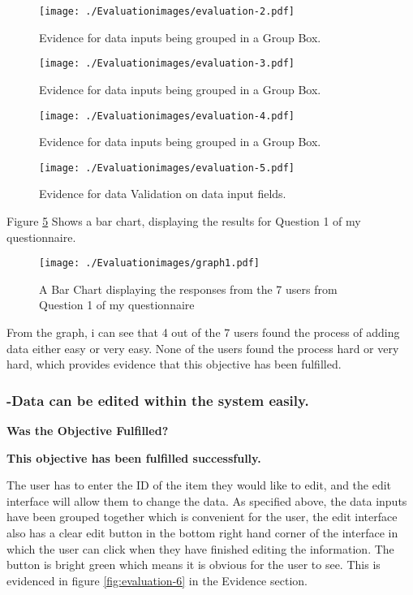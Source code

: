 \begin{figure}[H]
\caption{Evidence for data inputs being grouped in a Group Box.} \label{fig:evaluation-2}
\hfill\texttt{[image: ./Evaluationimages/evaluation-2.pdf]}
\end{figure}

\begin{figure}[H]
\caption{Evidence for data inputs being grouped in a Group Box.} \label{fig:evaluation-3}
\hfill\texttt{[image: ./Evaluationimages/evaluation-3.pdf]}
\end{figure}

\begin{figure}[H]
\caption{Evidence for data inputs being grouped in a Group Box.} \label{fig:evaluation-4}
\hfill\texttt{[image: ./Evaluationimages/evaluation-4.pdf]}
\end{figure}

\begin{figure}[H]
\caption{Evidence for data Validation on data input fields.} \label{fig:evaluation-5}
\hfill\texttt{[image: ./Evaluationimages/evaluation-5.pdf]}
\end{figure}

\pagebreak

Figure \ref{graph1} Shows a bar chart, displaying the results for Question 1 of my questionnaire.

\begin{figure}[H]
\caption{A Bar Chart displaying the responses from the 7 users from Question 1 of my questionnaire} \label{graph1}
\hfill\texttt{[image: ./Evaluationimages/graph1.pdf]}
\end{figure}

From the graph, i can see that 4 out of the 7 users found the process of adding data either easy or very easy. None of the users found the process hard or very hard, which provides evidence that this objective has been fulfilled.




\pagebreak
\subsubsection{-Data can be edited within the system easily.}
\textbf{Was the Objective Fulfilled?} \newline

\textbf{\large{This objective has been fulfilled successfully.}}

  The user has to enter the ID of the item they would like to edit, and the edit interface will allow them to change the data. As specified above, the data inputs have been grouped together which is convenient for the user, the edit interface also has a clear edit button in the bottom right hand corner of the interface in which the user can click when they have finished editing the information. The button is bright green which means it is obvious for the user to see. This is evidenced in figure \ref{fig:evaluation-6} in the Evidence section.\newline

